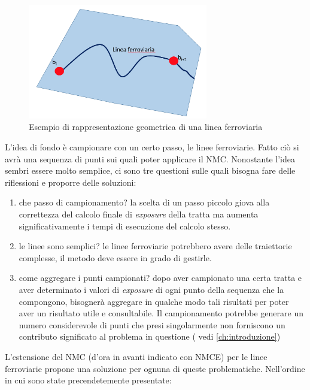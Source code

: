 \begin{figure}[bth]
  \centering
  \includegraphics[width=0.7\textwidth]{img/lineaFerroviaria}
  \caption{Esempio di rappresentazione geometrica di una linea ferroviaria } 
  \label{lineeFerroviarie}
\end{figure}
L'idea di fondo è campionare con un certo passo, le linee ferroviarie. Fatto ciò si avrà una sequenza di punti sui quali poter applicare il NMC. \newline
Nonostante l'idea sembri essere molto semplice, ci sono tre questioni sulle quali bisogna fare delle riflessioni e proporre delle soluzioni:
\begin{enumerate}
\item che passo di campionamento? la scelta di un passo piccolo giova alla correttezza del calcolo finale di \textit{exposure} della tratta ma aumenta significativamente i tempi di esecuzione del calcolo stesso.
\item le linee sono semplici? le linee ferroviarie potrebbero avere delle traiettorie complesse, il metodo deve essere in grado di gestirle.
\item come aggregare i punti campionati? dopo aver campionato una certa tratta e aver determinato i valori di \textit{exposure} di ogni punto della sequenza che la compongono, bisognerà aggregare in qualche modo tali risultati per poter aver un risultato utile e consultabile.  
Il campionamento potrebbe generare un numero considerevole di punti che presi singolarmente non forniscono un contributo significato al problema in questione ( vedi \ref{ch:introduzione})
\end{enumerate}
L'estensione del NMC (d'ora in avanti indicato con NMCE) per le linee ferroviarie propone una soluzione per ognuna di queste problematiche. Nell'ordine in cui sono state precendetemente presentate: 

